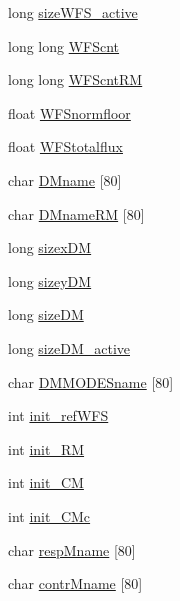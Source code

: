 \begin{DoxyCompactItemize}
\item 
long \hyperlink{structAOLOOPCONTROL__CONF_a0e634ccd570c9488a78ab9160a5977fb}{size\+W\+F\+S\+\_\+active}
\item 
long long \hyperlink{structAOLOOPCONTROL__CONF_aef0d536a3ea46154930a9bf57967c5db}{W\+F\+Scnt}
\item 
long long \hyperlink{structAOLOOPCONTROL__CONF_a63dbde5007af6a25cd505116ce84ad78}{W\+F\+Scnt\+R\+M}
\item 
float \hyperlink{structAOLOOPCONTROL__CONF_abd08de6307435bc1a73849ae8f784169}{W\+F\+Snormfloor}
\item 
float \hyperlink{structAOLOOPCONTROL__CONF_ab19e1ec513dfe03aef82717b63466374}{W\+F\+Stotalflux}
\item 
char \hyperlink{structAOLOOPCONTROL__CONF_a38c12b5e2727e677d6f1b27e96ac0b9d}{D\+Mname} \mbox{[}80\mbox{]}
\item 
char \hyperlink{structAOLOOPCONTROL__CONF_abcec40ab158c6bb74e9f84a9c9e28ff7}{D\+Mname\+R\+M} \mbox{[}80\mbox{]}
\item 
long \hyperlink{structAOLOOPCONTROL__CONF_ae5594424863b939ba332dd90c23945a3}{sizex\+D\+M}
\item 
long \hyperlink{structAOLOOPCONTROL__CONF_a75c007f53da2b54406dd154b92f8fd28}{sizey\+D\+M}
\item 
long \hyperlink{structAOLOOPCONTROL__CONF_ae5d0e7cbeb583d44a3f2e6815e8ba7fb}{size\+D\+M}
\item 
long \hyperlink{structAOLOOPCONTROL__CONF_ad9660111fdae1657791d01e36e7f0a9f}{size\+D\+M\+\_\+active}
\item 
char \hyperlink{structAOLOOPCONTROL__CONF_aae8fddca77092d6c3c92120032ea878c}{D\+M\+M\+O\+D\+E\+Sname} \mbox{[}80\mbox{]}
\item 
int \hyperlink{structAOLOOPCONTROL__CONF_ab9f4a51ff0cea6a1cc440dce8fa4a90e}{init\+\_\+ref\+W\+F\+S}
\item 
int \hyperlink{structAOLOOPCONTROL__CONF_ac037d1346e22c2ad75d3502a7d7a3f71}{init\+\_\+\+R\+M}
\item 
int \hyperlink{structAOLOOPCONTROL__CONF_aeaec4b01928a540a14d7b6c96c1a6027}{init\+\_\+\+C\+M}
\item 
int \hyperlink{structAOLOOPCONTROL__CONF_a7b1f58aaadeec31d152f2494b1120ebd}{init\+\_\+\+C\+Mc}
\item 
char \hyperlink{structAOLOOPCONTROL__CONF_ad1af43c9e7a9ed5002376c32fd69e16a}{resp\+Mname} \mbox{[}80\mbox{]}
\item 
char \hyperlink{structAOLOOPCONTROL__CONF_a30b003e3e71280aa46e5423021f3c807}{contr\+Mname} \mbox{[}80\mbox{]}

\end{DoxyCompactItemize}
